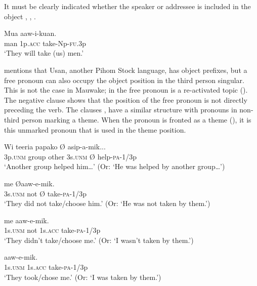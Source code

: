 It must be clearly indicated whether the speaker or addressee is included in the object , , .

\ea%
\label{ex:3:x557}
\gll Mua  aaw-i-kuan. \\
man 1p.\textsc{acc} take-Np-\textsc{fu}.3p\\
\glt`They will take (us) men.'
\z

\citet[52--53]{Reesink1987} mentions that Usan, another Pihom Stock language, has object prefixes, but a free pronoun can also occupy the object position in the third person singular. This is not the case in Mauwake; in  the free pronoun  is a re-activated topic (). The negative clause  shows that the position of the free pronoun is not directly preceding the verb. The clauses ,  have a similar structure with pronouns in non-third person marking a theme. When the pronoun is fronted as a theme (), it is this unmarked pronoun that is used in the theme position. 

\ea%
\label{ex:3:x1354}
\gll Wi teeria papako  {\O} asip-a-mik... \\
3p.\textsc{unm} group other 3s.\textsc{unm} {\O} help-\textsc{pa}-1/3p\\
\glt`Another group helped him{\dots}' (Or: `He was helped by another group{\dots}')
\z

\ea%
\label{ex:3:x1353}
\gll {} me {\O aaw-e-mik.} \\
3s.\textsc{unm} not {\O} take-\textsc{pa}-1/3p\\
\glt`They did not take/choose him.' (Or: `He was not taken by them.')
\z

\ea%
\label{ex:3:x684}
\gll {} me  aaw-e-mik. \\
1s.\textsc{unm} not 1s.\textsc{acc} take-\textsc{pa}-1/3p\\
\glt`They didn't take/choose me.' (Or: `I wasn't taken by them.')
\z

\ea%
\label{ex:3:x560}
\gll {}  aaw-e-mik. \\
1s.\textsc{unm} 1s.\textsc{acc} take-\textsc{pa}-1/3p\\
\glt`They took/chose me.' (Or: `I was taken by them.')
\z

